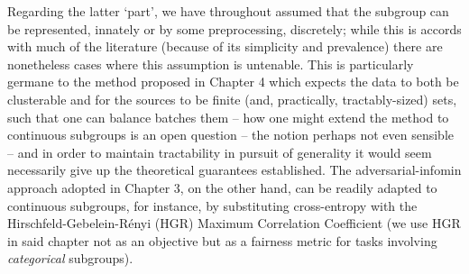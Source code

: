 Regarding the latter `part', we have throughout assumed that the subgroup can be represented,
innately or by some preprocessing, discretely; while this is accords with much of the literature
(because of its simplicity and prevalence) there are nonetheless cases where this assumption is
untenable.
%
This is particularly germane to the method proposed in Chapter 4 which expects the data to both be
clusterable and for the sources to be finite (and, practically, tractably-sized) sets, such that
one can balance batches \wrt{} them -- how one might extend the method to continuous subgroups is
an open question -- the notion perhaps not even sensible -- and in order to maintain tractability
in pursuit of generality it would seem necessarily give up the theoretical guarantees established.
%
The adversarial-infomin approach adopted in Chapter 3, on the other hand, can be readily adapted to
continuous subgroups, for instance, by substituting cross-entropy with the
Hirschfeld-Gebelein-R\'enyi (HGR) Maximum Correlation Coefficient (we use HGR in said chapter not
as an objective but as a fairness metric for tasks involving \emph{categorical} subgroups).

